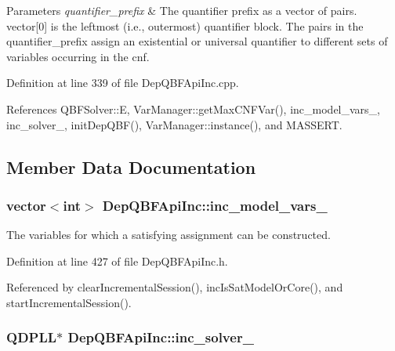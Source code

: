 \begin{DoxyParams}{Parameters}
{\em quantifier\-\_\-prefix} & The quantifier prefix as a vector of pairs. vector\mbox{[}0\mbox{]} is the leftmost (i.\-e., outermost) quantifier block. The pairs in the quantifier\-\_\-prefix assign an existential or universal quantifier to different sets of variables occurring in the cnf. \\
\hline
\end{DoxyParams}


Definition at line 339 of file Dep\-Q\-B\-F\-Api\-Inc.\-cpp.



References Q\-B\-F\-Solver\-::\-E, Var\-Manager\-::get\-Max\-C\-N\-F\-Var(), inc\-\_\-model\-\_\-vars\-\_\-, inc\-\_\-solver\-\_\-, init\-Dep\-Q\-B\-F(), Var\-Manager\-::instance(), and M\-A\-S\-S\-E\-R\-T.



\subsection{Member Data Documentation}
\hypertarget{classDepQBFApiInc_a4dc19de8b66b9133906d7ef6b228e075}{
\subsubsection[{inc\-\_\-model\-\_\-vars\-\_\-}]{\setlength{\rightskip}{0pt plus 5cm}vector$<$int$>$ Dep\-Q\-B\-F\-Api\-Inc\-::inc\-\_\-model\-\_\-vars\-\_\-\hspace{0.3cm}{\ttfamily [protected]}}}\label{classDepQBFApiInc_a4dc19de8b66b9133906d7ef6b228e075}


The variables for which a satisfying assignment can be constructed. 



Definition at line 427 of file Dep\-Q\-B\-F\-Api\-Inc.\-h.



Referenced by clear\-Incremental\-Session(), inc\-Is\-Sat\-Model\-Or\-Core(), and start\-Incremental\-Session().

\hypertarget{classDepQBFApiInc_ab1380371d12eb536493bfa8851ee7bc3}{
\subsubsection[{inc\-\_\-solver\-\_\-}]{\setlength{\rightskip}{0pt plus 5cm}Q\-D\-P\-L\-L$\ast$ Dep\-Q\-B\-F\-Api\-Inc\-::inc\-\_\-solver\-\_\-\hspace{0.3cm}{\ttfamily [protected]}}}\label{classDepQBFApiInc_ab1380371d12eb536493bfa8851ee7bc3}


